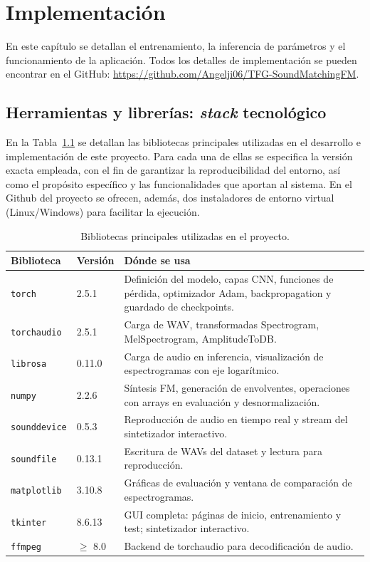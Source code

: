 \chapter{Implementación}
\label{cap:Implementacion}

En este capítulo se detallan el entrenamiento, la inferencia de parámetros y el funcionamiento de la aplicación. Todos los detalles de implementación se pueden encontrar en el GitHub: \url{https://github.com/Angelji06/TFG-SoundMatchingFM}.


\section{Herramientas y librerías: \textit{stack} tecnológico}

En la Tabla~\ref{tab:stack_tecnologico} se detallan las bibliotecas principales utilizadas en el desarrollo e implementación de este proyecto. Para cada una de ellas se especifica la versión exacta empleada, con el fin de garantizar la reproducibilidad del entorno, así como el propósito específico y las funcionalidades que aportan al sistema. En el Github del proyecto se ofrecen, además, dos instaladores de entorno virtual (Linux/Windows) para facilitar la ejecución.

\begin{table}[H]
\centering
\small
\begin{tabular}{|l|l|p{10cm}|}
\hline
\textbf{Biblioteca} & \textbf{Versión} & \textbf{Dónde se usa} \\
\hline
\texttt{torch} & 2.5.1 & Definición del modelo, capas CNN, funciones de pérdida, optimizador Adam, backpropagation y guardado de checkpoints. \\
\hline
\texttt{torchaudio} & 2.5.1 & Carga de WAV, transformadas Spectrogram, MelSpectrogram, AmplitudeToDB. \\
\hline
\texttt{librosa} & 0.11.0 & Carga de audio en inferencia, visualización de espectrogramas con eje logarítmico. \\
\hline
\texttt{numpy} & 2.2.6 & Síntesis FM, generación de envolventes, operaciones con arrays en evaluación y desnormalización. \\
\hline
\texttt{sounddevice} & 0.5.3 & Reproducción de audio en tiempo real y stream del sintetizador interactivo. \\
\hline
\texttt{soundfile} & 0.13.1 & Escritura de WAVs del dataset y lectura para reproducción. \\
\hline
\texttt{matplotlib} & 3.10.8 & Gráficas de evaluación y ventana de comparación de espectrogramas. \\
\hline
\texttt{tkinter} & 8.6.13 & GUI completa: páginas de inicio, entrenamiento y test; sintetizador interactivo. \\
\hline
\texttt{ffmpeg} & $\ge$ 8.0 & Backend de torchaudio para decodificación de audio. \\
\hline
\end{tabular}
\caption{Bibliotecas principales utilizadas en el proyecto.}
\label{tab:stack_tecnologico}
\end{table}

